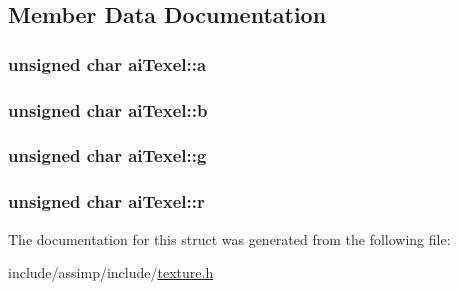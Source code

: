\subsection{Member Data Documentation}
\hypertarget{structai_texel_a6d4450e83b02b29d24f7aab27958034e}{
\subsubsection[{a}]{\setlength{\rightskip}{0pt plus 5cm}unsigned char ai\-Texel\-::a}}\label{structai_texel_a6d4450e83b02b29d24f7aab27958034e}
\hypertarget{structai_texel_a5b4f97f69cf59cb9065af67389599ba6}{
\subsubsection[{b}]{\setlength{\rightskip}{0pt plus 5cm}unsigned char ai\-Texel\-::b}}\label{structai_texel_a5b4f97f69cf59cb9065af67389599ba6}
\hypertarget{structai_texel_a41da3516b8241165e4ca58ea8ed68fe6}{
\subsubsection[{g}]{\setlength{\rightskip}{0pt plus 5cm}unsigned char ai\-Texel\-::g}}\label{structai_texel_a41da3516b8241165e4ca58ea8ed68fe6}
\hypertarget{structai_texel_ae9408c0d18f6ff597715cc626398a0ff}{
\subsubsection[{r}]{\setlength{\rightskip}{0pt plus 5cm}unsigned char ai\-Texel\-::r}}\label{structai_texel_ae9408c0d18f6ff597715cc626398a0ff}


The documentation for this struct was generated from the following file\-:\begin{DoxyCompactItemize}
\item 
include/assimp/include/\hyperlink{texture_8h}{texture.\-h}\end{DoxyCompactItemize}
